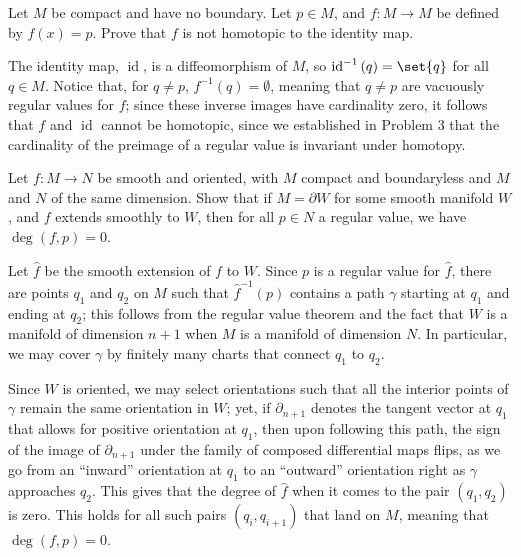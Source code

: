 \documentclass[10pt]{mypackage}
\begin{document}
\begin{problem}[Problem 5]
  Let $M$ be compact and have no boundary. Let $p\in M$, and $f\colon M\rightarrow M$ be defined by $f(x) = p$. Prove that $f$ is not homotopic to the identity map.
\end{problem}
\begin{solution}
  The identity map, $ \operatorname{id} $, is a diffeomorphism of $M$, so $\operatorname{id}^{-1}\left( q \right) = \set{q}$ for all $q\in M$. Notice that, for $q\neq p$, $f^{-1}\left( q \right) = \emptyset$, meaning that $q\neq p$ are vacuously regular values for $f$; since these inverse images have cardinality zero, it follows that $f$ and $ \operatorname{id} $ cannot be homotopic, since we established in Problem 3 that the cardinality of the preimage of a regular value is invariant under homotopy.
\end{solution}
\begin{problem}[Problem 6]
  Let $f\colon M\rightarrow N$ be smooth and oriented, with $M$ compact and boundaryless and $M$ and $N$ of the same dimension. Show that if $M = \partial W$ for some smooth manifold $W$, and $f$ extends smoothly to $W$, then for all $p\in N$ a regular value, we have $\operatorname{deg}\left( f,p \right) = 0$.
\end{problem}
\begin{solution}
  Let $\hat{f}$ be the smooth extension of $f$ to $W$. Since $p$ is a regular value for $\hat{f}$, there are points $q_1$ and $q_2$ on $M$ such that $\hat{f}^{-1}\left( p \right)$ contains a path $\gamma$ starting at $q_1$ and ending at $q_2$; this follows from the regular value theorem and the fact that $W$ is a manifold of dimension $n + 1$ when $M$ is a manifold of dimension $N$. In particular, we may cover $\gamma$ by finitely many charts that connect $q_1$ to $q_2$.\newline

  Since $W$ is oriented, we may select orientations such that all the interior points of $\gamma$ remain the same orientation in $W$; yet, if $\partial_{n+1}$ denotes the tangent vector at $q_1$ that allows for positive orientation at $q_1$, then upon following this path, the sign of the image of $\partial_{n+1}$ under the family of composed differential maps flips, as we go from an ``inward'' orientation at $q_1$ to an ``outward'' orientation right as $\gamma$ approaches $q_2$. This gives that the degree of $\hat{f}$ when it comes to the pair $\left( q_1,q_2 \right)$ is zero. This holds for all such pairs $\left( q_i,q_{i+1} \right)$ that land on $M$, meaning that $ \operatorname{deg}\left( f,p \right) = 0 $.
\end{solution}
\end{document}
